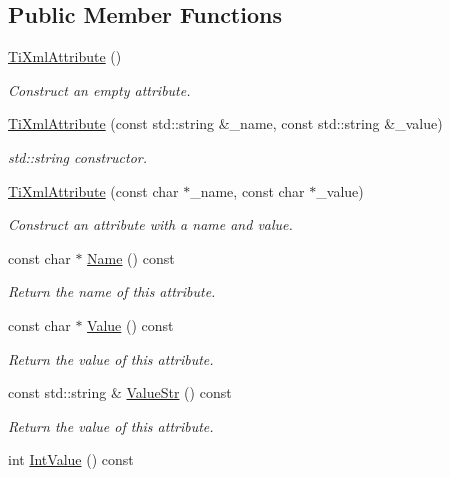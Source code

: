 \subsection*{Public Member Functions}
\begin{DoxyCompactItemize}
\item 
\hyperlink{class_ti_xml_attribute_a9cfa3c8179873fd485d83003b114f8e1}{Ti\+Xml\+Attribute} ()
\begin{DoxyCompactList}\small\item\em Construct an empty attribute. \end{DoxyCompactList}\item 
\hyperlink{class_ti_xml_attribute_a052213522caac3979960e0714063861d}{Ti\+Xml\+Attribute} (const std\+::string \&\+\_\+name, const std\+::string \&\+\_\+value)
\begin{DoxyCompactList}\small\item\em std\+::string constructor. \end{DoxyCompactList}\item 
\hyperlink{class_ti_xml_attribute_a759d0b76fb8fcf765ecab243bc14f05e}{Ti\+Xml\+Attribute} (const char $\ast$\+\_\+name, const char $\ast$\+\_\+value)
\begin{DoxyCompactList}\small\item\em Construct an attribute with a name and value. \end{DoxyCompactList}\item 
const char $\ast$ \hyperlink{class_ti_xml_attribute_a008ef948268ee752b58c60d63d84bb01}{Name} () const
\begin{DoxyCompactList}\small\item\em Return the name of this attribute. \end{DoxyCompactList}\item 
const char $\ast$ \hyperlink{class_ti_xml_attribute_ac9f0b56fcacbedb6eb49e5f282bef014}{Value} () const
\begin{DoxyCompactList}\small\item\em Return the value of this attribute. \end{DoxyCompactList}\item 
const std\+::string \& \hyperlink{class_ti_xml_attribute_af70a11c3a0c07e61bd6e215f1f9b24e9}{Value\+Str} () const
\begin{DoxyCompactList}\small\item\em Return the value of this attribute. \end{DoxyCompactList}\item 
int \hyperlink{class_ti_xml_attribute_ac8501370b065df31a35003c81d87cef2}{Int\+Value} () const

\end{DoxyCompactItemize}

